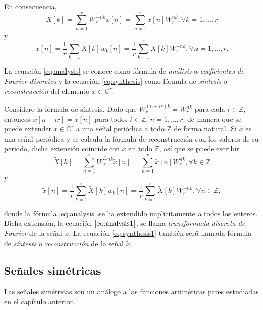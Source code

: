 En consecuencia,
\begin{equation}\label{eq:analysis}
    X[k] = \sum_{n=1}^{r} \overline{W_r^{-n k}} x[n] = \sum_{n=1}^{r} x[n] W_r^{n k}, \forall k=1,\ldots,r
\end{equation}
y
\begin{equation}\label{eq:synthesis}
    x[n] = \frac{1}{r} \sum_{k=1}^{r} X[k] w_k[n] = \frac{1}{r} \sum_{k=1}^{r} X[k] W_r^{- n k}, \forall n=1,\ldots,r.
\end{equation}

La ecuación \eqref{eq:analysis} se conoce como fórmula de \emph{análisis} o \emph{coeficientes de Fourier discretos} y la ecuación \eqref{eq:synthesis} como fórmula de \emph{síntesis} o \emph{reconstrucción} del elemento $x \in \mathbb{C}^r$.
\bigskip

Considere la fórmula de síntesis. Dado que $W_r^{(n + i r) k} = W_r^{n k}$ para cada $i \in \mathbb{Z}$, entonces $x[n + i r] = x[n]$ para todos $i \in \mathbb{Z}$, $n=1,\ldots,r$, de manera que se puede extender $x \in \mathbb{C}^r$ a una señal periódica a todo $\mathbb{Z}$ de forma natural. Si $\tilde{x}$ es una señal periódica y se calcula la fórmula de reconstrucción con los valores de su periodo, dicha extensión coincide con $\tilde{x}$ en todo $\mathbb{Z}$, así que se puede escribir
\begin{equation}\label{eq:analysis1}
    \tilde{X}[k] = \sum_{n=1}^{r} \overline{W_r^{-n k}} \tilde{x}[n] = \sum_{n=1}^{r} \tilde{x}[n] W_r^{n k}, \forall k \in \mathbb{Z}
\end{equation}
y
\begin{equation}\label{eq:synthesis1}
    \tilde{x}[n] = \frac{1}{r} \sum_{k=1}^{r} \tilde{X}[k] w_k[n] = \frac{1}{r} \sum_{k=1}^{r} \tilde{X}[k] W_r^{- n k}, \forall n \in \mathbb{Z},
\end{equation}

donde la fórmula \eqref{eq:analysis} se ha extendido implicitamente  a todos los enteros. Dicha extensión, la ecuación $\eqref{eq:analysis1}$, se llama \emph{transformada discreta de Fourier} de la señal $\tilde{x}$. La ecuación \eqref{eq:synthesis1} también será llamada fórmula de \emph{síntesis} o \emph{reconstrucción} de la señal $\tilde{x}$.

\subsection{Señales simétricas}

Las señales simétricas son un análogo a las funciones aritméticas pares estudiadas en el capítulo anterior.

